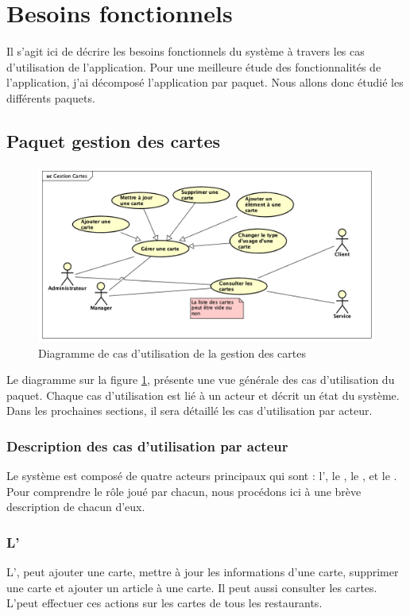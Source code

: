 \section{Besoins fonctionnels}
Il s'agit ici de décrire les besoins fonctionnels du système à travers les cas d'utilisation de l'application. Pour une meilleure étude des fonctionnalités de l'application, j'ai décomposé l'application par paquet. Nous allons donc étudié les différents paquets.
\subsection{Paquet gestion des cartes}
\begin{figure}[H]
	\centering
	\includegraphics[scale=0.4]{assets/images/gestion_cartes_uc.png}
	\caption{Diagramme de cas d'utilisation de la gestion des cartes}
	\label{fig.10}
\end{figure}
Le diagramme sur la figure \ref{fig.10}, présente une vue générale des cas d'utilisation du paquet. Chaque cas d'utilisation est lié à un acteur et décrit un état du système. Dans les prochaines sections, il sera détaillé les cas d'utilisation par acteur.
\subsubsection{Description des cas d'utilisation par acteur}
Le système est composé de quatre acteurs principaux qui sont : l'\adm, le \m, le \sev, et le \cl. Pour comprendre le rôle joué par chacun, nous procédons ici à une brève description de chacun d'eux.
\subsubsection*{L'\adm}
L'\adm,  peut ajouter une carte, mettre à jour les informations d'une carte, supprimer une carte et ajouter un article à une carte. Il peut aussi consulter les cartes. L'\adm peut effectuer ces actions sur les cartes de tous les restaurants.

